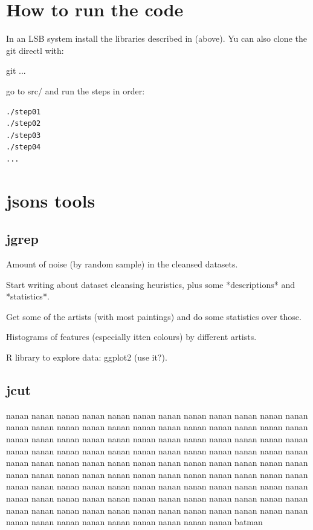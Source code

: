 \documentclass[11pt,a4paper]{report}
\begin{document}
\chapter{How to run the code}

In an LSB system install the libraries described in (above).  Yu can also clone
the git directl with:

git ...

go to src/ and run the steps in order:

\begin{Verbatim}
./step01
./step02
./step03
./step04
...
\end{Verbatim}

\chapter{jsons tools}

\section{jgrep}

Amount of noise (by random sample) in the cleansed datasets.

Start writing about dataset cleansing heuristics, plus some *descriptions* and
*statistics*.

Get some of the artists (with most paintings) and do some statistics over
those.

Histograms of features (especially itten colours) by different artists.

R library to explore data: ggplot2 (use it?).

\section{jcut}

nanan nanan nanan nanan nanan nanan nanan nanan nanan nanan nanan nanan nanan
nanan nanan nanan nanan nanan nanan nanan nanan nanan nanan nanan nanan nanan
nanan nanan nanan nanan nanan nanan nanan nanan nanan nanan nanan nanan nanan
nanan nanan nanan nanan nanan nanan nanan nanan nanan nanan nanan nanan nanan
nanan nanan nanan nanan nanan nanan nanan nanan nanan nanan nanan nanan nanan
nanan nanan nanan nanan nanan nanan nanan nanan nanan nanan nanan nanan nanan
nanan nanan nanan nanan nanan nanan nanan nanan nanan nanan nanan nanan nanan
nanan nanan nanan nanan nanan nanan nanan nanan nanan nanan nanan nanan nanan
nanan nanan nanan nanan nanan nanan nanan nanan nanan nanan nanan nanan nanan
batman
\end{document}
